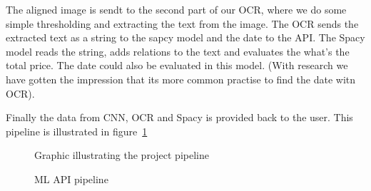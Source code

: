 The aligned image is sendt to the second part of our OCR, where we do some simple thresholding and extracting the text from the image.
The OCR sends the extracted text as a string to the sapcy model and the date to the API\@.
The Spacy model reads the string, adds relations to the text and evaluates the what's the total price.
The date could also be evaluated in this model. (With research we have gotten the impression that its more common practise to find the date witn OCR).

Finally the data from CNN, OCR and Spacy is provided back to the user.
This pipeline is illustrated in figure~\ref{fig:pipeline}

\begin{figure}[h]
    \caption{Graphic illustrating the project pipeline}
    \label{fig:pipeline}
\end{figure}

\begin{figure}[h]
    \caption{ML API pipeline}
    \label{fig:ML API}
\end{figure}

